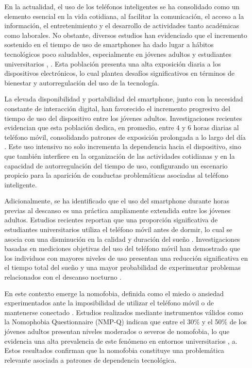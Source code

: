 En la actualidad, el uso de los teléfonos inteligentes se ha consolidado como un elemento 
esencial en la vida cotidiana, al facilitar la comunicación, el acceso a la información, el entretenimiento y el desarrollo de actividades tanto académicas como laborales. No obstante, diversos estudios han evidenciado que el incremento sostenido en el tiempo de uso de smartphones ha dado lugar a hábitos tecnológicos poco saludables, especialmente en jóvenes adultos y estudiantes universitarios  \cite{ELHAI2017251}, \cite{MontagWalla2016}. Esta población presenta una alta exposición diaria a los dispositivos electrónicos, lo cual plantea desafíos significativos en términos de bienestar y autorregulación del uso de la tecnología.

La elevada disponibilidad y portabilidad del smartphone, junto con la necesidad constante de interacción digital, han favorecido el incremento progresivo del tiempo de uso del dispositivo entre los jóvenes adultos. Investigaciones recientes evidencian que esta población dedica, en promedio, entre 4 y 6 horas diarias al teléfono móvil, consolidando patrones de exposición prolongada a lo largo del día \cite{Andrews2015}. Este uso intensivo no solo incrementa la dependencia hacia el dispositivo, sino que también interfiere en la organización de las actividades cotidianas y en la capacidad de autorregulación del tiempo de uso, configurando un escenario propicio para la aparición de conductas problemáticas asociadas al teléfono inteligente. 

Adicionalmente, se ha identificado que el uso del smartphone durante horas previas al descanso es una práctica ampliamente extendida entre los jóvenes adultos. Estudios recientes reportan que una proporción significativa de estudiantes universitarios utiliza el teléfono móvil antes de dormir, lo cual se asocia con una disminución en la calidad y duración del sueño \cite{Joshi2021}. Investigaciones basadas en mediciones objetivas del uso del teléfono móvil han demostrado que los individuos con mayores niveles de uso presentan una reducción significativa en el tiempo total del sueño y una mayor probabilidad de experimentar problemas relacionados con el descanso nocturno \cite{Lemola2015}.

En este contexto emerge la nomofobia, definida como el miedo o ansiedad experimentados ante la imposibilidad de utilizar el teléfono móvil o de mantenerse conectado \cite{YildirimCorreia2015}. Estudios realizados mediante instrumentos válidos como la Nomophobia Questionnaire (NMP-Q) indican que entre el 30\% y el 50\% de los jóvenes adultos presentan niveles moderados o severos de nomofobia, lo que evidencia una alta prevalencia de este fenómeno en entornos universitarios \cite{YildirimCorreia2015}, a\cite{LeonMejia2021}. Estos resultados confirman que la nomofobia constituye una problemática relevante asociada a patrones de dependencia tecnológica. 

